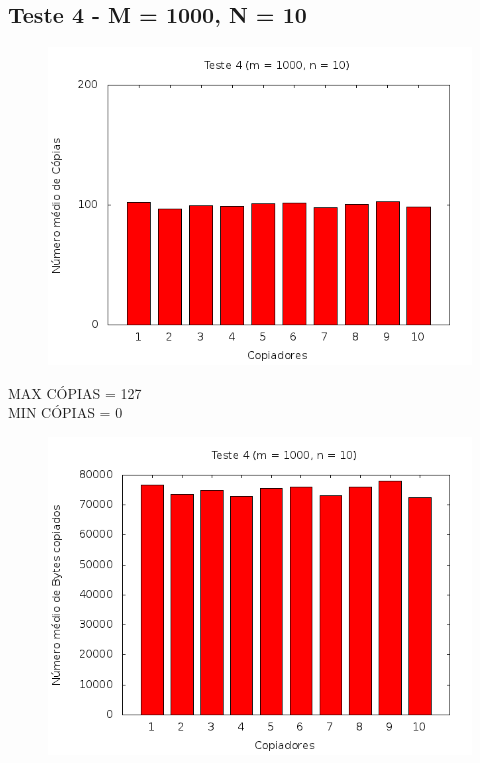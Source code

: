 \documentclass[12pt,a4paper]{article}
\begin{document}
\pagebreak
\subsection{Teste 4 - M = 1000, N = 10}
\begin{center}
\begin{figure}[H]
    \center
    \includegraphics[scale=0.5]{imagens/grafico_copias4.png}
    \label{teste4_copias}
\end{figure}
\end{center}

MAX CÓPIAS = 127
\\
MIN CÓPIAS = 0

\begin{center}
\begin{figure}[H]
    \center
    \includegraphics[scale=0.5]{imagens/grafico_bytes4.png}
    \label{teste4_bytes}
\end{figure}
\end{center}
\end{document}
